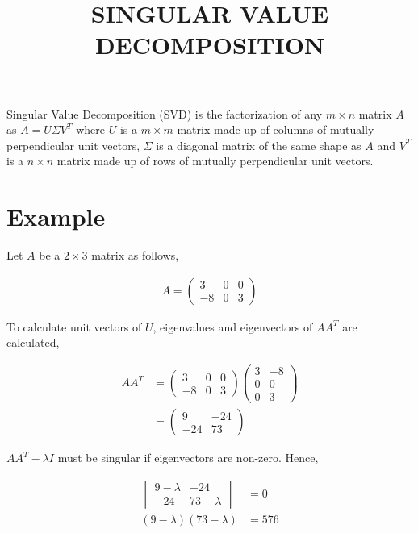 \documentclass[11pt, a4paper]{article}
\begin{document}
\title{SINGULAR VALUE DECOMPOSITION}
\date{}
\maketitle

Singular Value Decomposition (SVD) is the factorization of any $m\times n$ matrix $A$ as $A = U \Sigma V^T$ where $U$ is a $m \times m$ matrix made up of columns of mutually perpendicular unit vectors, $\Sigma$ is a diagonal matrix of the same shape as $A$ and $V^T$ is a $n \times n$ matrix made up of rows of mutually perpendicular unit vectors. 

\section{Example}

Let $A$ be a $2 \times 3$ matrix as follows,

\begin{align*}
	A = \begin{pmatrix}
	3  & 0 & 0 \\
	-8 & 0 & 3 
	\end{pmatrix}
\end{align*}

To calculate unit vectors of $U$, eigenvalues and eigenvectors of $AA^T$ are calculated,

\begin{align*}
	AA^T &= \begin{pmatrix}
	3  & 0 & 0 \\
	-8 & 0 & 3 
	\end{pmatrix} \begin{pmatrix}
	3 & -8 \\
	0 & 0 \\
	0 & 3
	\end{pmatrix} \\
	&= \begin{pmatrix}
	9 & -24 \\
	-24 & 73
	\end{pmatrix}
\end{align*}

$AA^T - \lambda I$ must be singular if eigenvectors are non-zero. Hence,

\begin{align*}
	\begin{vmatrix}
	9 - \lambda             & -24          \\
	-24                     & 73 - \lambda 
	\end{vmatrix}           & = 0          \\
	(9-\lambda)(73-\lambda) & = 576        
\end{align*}
\end{document}
